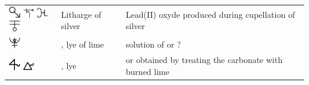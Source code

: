 \documentclass[british,final,landscape]{scrartcl}
\begin{document}
\begin{refsection}
\begin{supertabular}{p{0.3\textwidth}p{0.34\textwidth}p{0.34\textwidth}}
   \includegraphics[width=5mm]{Compounds/LithargeOfSilver} \includegraphics[width=5mm]{Compounds/LithargeOfSilver2} \includegraphics[width=5mm]{Compounds/LithargeOfSilver3} \includegraphics[width=5mm]{Compounds/LithargeOfSilver4} & Litharge of silver & Lead(II) oxyde produced during cupellation of silver \\
   \includegraphics[width=5mm]{Compounds/LyeOfLime} & , lye of lime & solution of  or ? \\
   \includegraphics[width=5mm]{Compounds/Lye} \includegraphics[width=5mm]{Compounds/Lye2} & , lye &  or  obtained by treating the carbonate with burned lime \\

\end{supertabular}
\end{refsection}
\end{document}

